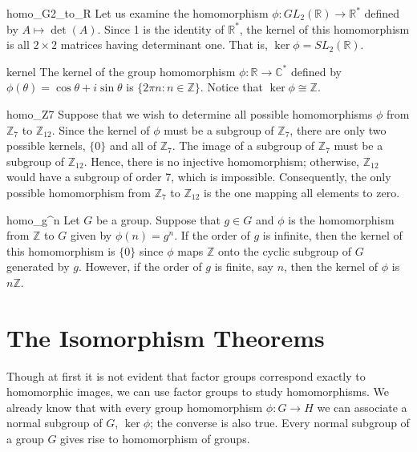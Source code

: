  
\begin{example}{homo_G2_to_R}
Let us examine the homomorphism $\phi : GL_2( {\mathbb R }) \rightarrow
{\mathbb R}^\ast$ defined by $A \mapsto \det( A )$. Since 1 is the
identity of ${\mathbb R}^\ast$, the kernel of this homomorphism is all
$2 \times 2$ matrices having determinant one. That is, $\ker \phi =
SL_2( {\mathbb R })$.
\mbox{\hspace{1in}}
\end{example}
 
 
\begin{example}{kernel}
The kernel of the group homomorphism $\phi : {\mathbb R} \rightarrow
{\mathbb C}^\ast$ defined by $\phi( \theta ) = \cos \theta + i \sin
\theta$ is $\{ 2 \pi n : n \in {\mathbb Z} \}$. Notice that $\ker \phi
\cong {\mathbb Z}$. 
\end{example}
 
 
\begin{example}{homo_Z7}
Suppose that we wish to determine all possible homomorphisms $\phi$
from ${\mathbb Z}_7$ to  ${\mathbb Z}_{12}$. Since the kernel of $\phi$ must
be a subgroup of  ${\mathbb Z}_7$, there are only two possible
kernels, $\{ 0 \}$ and all of ${\mathbb Z}_7$.  The image of a subgroup
of ${\mathbb Z}_7$ must be a subgroup of ${\mathbb Z}_{12}$. Hence, there is
no injective homomorphism; otherwise, ${\mathbb Z}_{12}$ would have a
subgroup of order 7, which is impossible. Consequently, the only
possible homomorphism from ${\mathbb Z}_7$ to  ${\mathbb Z}_{12}$ is the one
mapping all elements to zero. 
\end{example}
 
 
\begin{example}{homo_g^n}
Let $G$ be a group. Suppose that  $g \in G$ and $\phi$ is the
homomorphism from ${\mathbb Z}$ to $G$ given by $\phi( n ) = g^n$. If the
order of $g$ is infinite, then the kernel of this homomorphism is $\{
0 \}$ since $\phi$ maps ${\mathbb Z}$ onto the cyclic subgroup of $G$
generated by $g$. However, if the order of $g$ is finite, say $n$,
then the kernel of $\phi$ is $n {\mathbb Z}$.
\end{example}
 

 
 
 
\section{The Isomorphism Theorems}
 
 
Though at first it is not evident that factor groups correspond
exactly to homomorphic images, we can use factor groups to study
homomorphisms. We already know that with every group homomorphism
$\phi: G \rightarrow H$ we can associate a normal subgroup of $G$,
$\ker \phi$; the converse is also true. Every normal subgroup of a
group $G$ gives rise to homomorphism of groups. 
 
